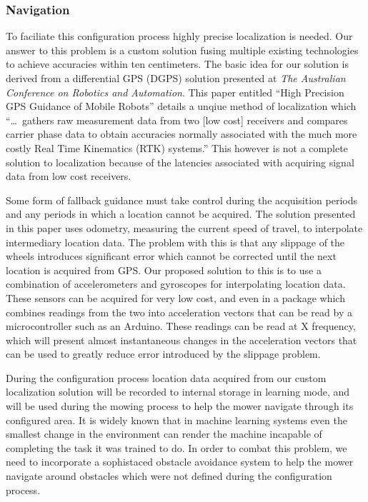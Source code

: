 \documentclass[11pt,letterpaper]{article}
\begin{document}
\subsubsection{Navigation}

To faciliate this configuration process highly precise localization is needed.
Our answer to this problem is a custom solution fusing multiple existing
technologies to achieve accuracies within ten centimeters.  The basic idea for
our solution is derived from a differential GPS (DGPS) solution presented at
\textit{The Australian Conference on Robotics and Automation}.  This paper
entitled ``High Precision GPS Guidance of Mobile Robots'' details a unqiue
method of localization which ``\ldots\ gathers raw measurement data from two
[low cost] receivers and compares carrier phase data to obtain accuracies
normally associated with the much more costly Real Time Kinematics (RTK)
systems.''\autocite{mobilegps}  This however is not a complete solution to
localization because of the latencies associated with acquiring signal data
from low cost receivers.  

Some form of fallback guidance must take control
during the acquisition periods and any periods in which a location cannot be
acquired.  The solution presented in this paper uses odometry, measuring the
current speed of travel, to interpolate intermediary location data.  The problem
with this is that any slippage of the wheels introduces significant error
which cannot be corrected until the next location is acquired from GPS.
Our proposed solution to this is to use a combination of accelerometers and
gyroscopes for interpolating location data.  These sensors can be acquired for
very low cost, and even in a package which combines readings from the two into
acceleration vectors that can be read by a microcontroller such as an Arduino. 
These readings can be read at X frequency, which will present almost
instantaneous changes in the acceleration vectors that can be used to greatly
reduce error introduced by the slippage problem.
  
During the configuration process location data acquired from our custom
localization solution will be recorded to internal storage in learning mode, and
will be used during the mowing process to help the mower navigate through its
configured area.  It is widely known that in machine learning systems even the
smallest change in the environment can render the machine incapable of
completing the task it was trained to do.  In order to combat this problem, we
need to incorporate a sophistaced obstacle avoidance system to help the mower
navigate around obstacles which were not defined during the configuration
process.
\end{document}
